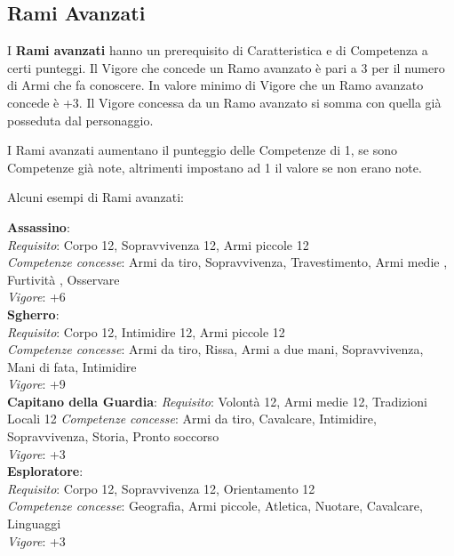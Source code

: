 \documentclass[12pt,a4paper,twoside,openany]{book}
\begin{document}
\begin{multicols}{2}	

\subsection{Rami Avanzati}

I \textbf{Rami avanzati} hanno un prerequisito di Caratteristica e di Competenza a certi punteggi.
Il Vigore che concede un Ramo avanzato è pari a 3 per il numero di Armi che fa conoscere. In valore minimo di Vigore che un Ramo avanzato concede è +3.
Il Vigore concessa da un Ramo avanzato si somma con quella già posseduta dal personaggio.

I Rami avanzati aumentano il punteggio delle Competenze di 1, se sono Competenze già note, altrimenti impostano ad 1 il valore se non erano note.

Alcuni esempi di Rami avanzati:\medskip

\textbf{Assassino}:\\
\textit{Requisito}: Corpo 12, Sopravvivenza 12, Armi piccole 12\\
\textit{Competenze concesse}: Armi da tiro, Sopravvivenza, Travestimento, Armi medie , Furtività , Osservare\\
\textit{Vigore}: +6\\

\textbf{Sgherro}:\\
\textit{Requisito}: Corpo 12, Intimidire 12, Armi piccole 12\\
\textit{Competenze concesse}: Armi da tiro, Rissa, Armi a due mani, Sopravvivenza, Mani di fata, Intimidire\\
\textit{Vigore}: +9\\

\textbf{Capitano della Guardia}:
\textit{Requisito}: Volontà 12, Armi medie 12, Tradizioni Locali 12
\textit{Competenze concesse}: Armi da tiro, Cavalcare, Intimidire, Sopravvivenza, Storia, Pronto soccorso\\
\textit{Vigore}: +3\\

\textbf{Esploratore}:\\
\textit{Requisito}: Corpo 12, Sopravvivenza 12, Orientamento 12\\
\textit{Competenze concesse}: Geografia, Armi piccole, Atletica, Nuotare, Cavalcare, Linguaggi\\
\textit{Vigore}: +3\\


\end{multicols}
\end{document}
